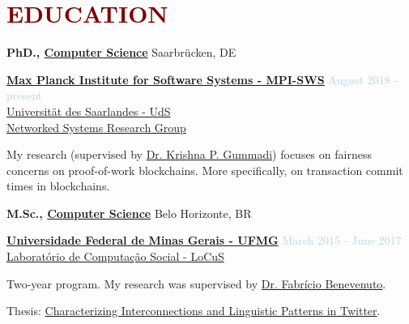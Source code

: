 \section*{\textcolor{maroon}{\normalsize EDUCATION}} 

\textbf{PhD., \href{https://www.mpi-sws.org}{Computer Science}}  \hfill {Saarbrücken, DE}
\begin{outerlist}

\item[] \href{https://www.mpi-sws.org}{\textbf{Max Planck Institute for Software Systems - MPI-SWS}} \hfill {\textcolor{lightblue}{August 2018 - present}}
\\ \href{https://www.uni-saarland.de/nc/en/home.html}{Universität des Saarlandes - UdS}
\\ \href{https://www.mpi-sws.org/research-areas/social-and-information-systems/}{Networked Systems Research Group}  \medskip

        \begin{innerlist}[-]
                \item My research (supervised by \href{https://people.mpi-sws.org/~gummadi/}{Dr. Krishna P. Gummadi}) focuses on fairness concerns on proof-of-work blockchains. More specifically, on transaction commit times in blockchains.
        \end{innerlist}

\end{outerlist}

\medskip


\textbf{M.Sc., 
        \href{https://ufmg.br/}
             {Computer Science}} \hfill {Belo Horizonte, BR}
\begin{outerlist}

\item[] \href{https://ufmg.br/}{\textbf{Universidade Federal de Minas Gerais - UFMG}}  \hfill {\textcolor{lightblue}{March 2015 - June 2017}}
\\ \href{https://www.dcc.ufmg.br/dcc/?q=pt-br/node/2728}{Laboratório de Computação Social - LoCuS}  \medskip 

        \begin{innerlist}[-]
        \item Two-year program. My research was supervised by \href{https://homepages.dcc.ufmg.br/~fabricio/}{Dr. Fabrício Benevenuto}.
        \item Thesis: \href{https://people.mpi-sws.org/~johnme/pdf/master-thesis_johnnatan_messias.pdf}{Characterizing Interconnections and Linguistic Patterns in Twitter}.
        \end{innerlist}

\end{outerlist}

